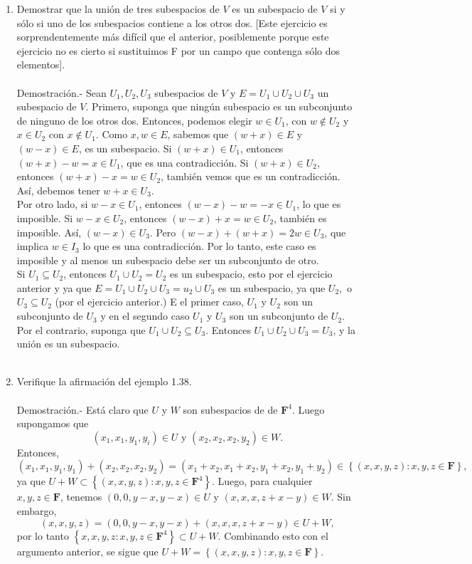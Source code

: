 \begin{enumerate}[\bfseries 1.]
    \item Demostrar que la unión de tres subespacios de $V$ es un subespacio de $V$ si y sólo si uno de los subespacios contiene a los otros dos. [Este ejercicio es sorprendentemente más difícil que el anterior, posiblemente porque este ejercicio no es cierto si sustituimos F por un campo que contenga sólo dos elementos].\\\\
	Demostración.-\; Sean $U_1,U_2,U_3$ subespacios de $V$ y $E=U_1\cup U_2 \cup U_3$ un subespacio de $V$. Primero, suponga que ningún subespacio es un subconjunto de ninguno de los otros dos. Entonces, podemos elegir $w\in U_1$, con $w\notin U_2$ y $x\in U_2$ con $x\notin U_1$. Como $x,w\in E$, sabemos que $(w+x)\in E$ y $(w-x)\in E$, es un subespacio. Si $(w+x)\in U_1$, entonces $(w+x)-w=x\in U_1$, que es una contradicción. Si $(w+x)\in U_2$, entonces $(w+x)-x=w\in U_2$, también vemos que es un contradicción. Así, debemos tener $w+x\in U_3$.\\
	Por otro lado, si $w-x\in U_1$, entonces $(w-x)-w=-x\in U_1$, lo que es imposible. Si $w-x\in U_2$, entonces $(w-x)+x=w\in U_2$, también es imposible. Así, $(w-x)\in U_3$. Pero $(w-x)+(w+x)=2w\in U_3$, que implica $w\in I_3$ lo que es una contradicción. Por lo tanto, este caso es imposible y al menos un subespacio debe ser un subconjunto de otro.\\
	Si $U_1\subseteq U_2$, entonces $U_1\cup U_2=U_2$ es un subespacio, esto por el ejercicio anterior y ya que $E=U_1\cup U_2\cup U_3=u_2\cup U_3$ es un subespacio, ya que $U_2,$ o $U_3\subseteq U_2$ (por el ejercicio anterior.) E el primer caso, $U_1$ y $U_2$ son un subconjunto de $U_3$ y en el segundo caso $U_1$ y $U_3$ son un subconjunto de $U_2$. \\
	Por el contrario, suponga que  $U_1 \cup U_2 \subseteq U_3$.  Entonces $U_1 \cup U_2 \cup U_3 = U_3$, y la unión es un subespacio.\\\\

    \item Verifique la afirmación del ejemplo 1.38.\\\\
	Demostración.-\; Está claro que $U$ y $W$ son subespacios de de $\textbf{F}^4$. Luego supongamos que 
	$$(x_1,x_1,y_1,y_i)\in U \mbox{ y }  (x_2,x_2,x_2,y_2)\in W.$$
	Entonces,
	$$(x_1,x_1,y_1,y_1)+(x_2,x_2,x_2,y_2)=(x_1+x_2,x_1+x_2,y_1+x_2,y_1+y_2)\in \left\{(x,x,y,z):x,y,z\in \textbf{F}\right\},$$
	ya que $U+W\subset \left\{(x,x,y,z):x,y,z\in \textbf{F}^4\right\}$. Luego, para cualquier $x,y,z\in \textbf{F}$, tenemos $(0,0,y-x,y-x)\in U$ y $(x,x,x,z+x-y)\in W$. Sin embargo,
	$$(x,x,y,z)=(0,0,y-x,y-x)+(x,x,x,z+x-y)\in U+W,$$
	por lo tanto $\left\{x,x,y,z:x,y,z\in \textbf{F}^4\right\}\subset U+W$. Combinando esto con el argumento anterior, se sigue que $U+W=\left\{(x,x,y,z):x,y,z \in \textbf{F}\right\}$.\\\\


\end{enumerate}
